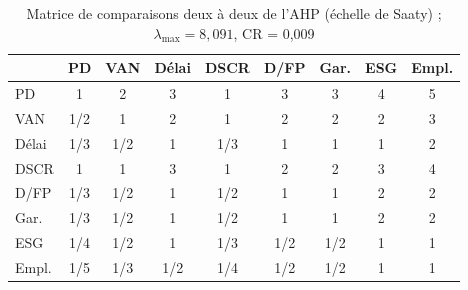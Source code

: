 \begin{table}[htbp]
\centering
\footnotesize\setlength{\tabcolsep}{4pt}
\caption{Matrice de comparaisons deux à deux de l'AHP (échelle de Saaty) ; $\lambda_{\max} = 8,091$, CR = 0,009}\label{tab:ahp}
\begin{tabular}{lcccccccc}
\toprule
 & PD & VAN & Délai & DSCR & D/FP & Gar. & ESG & Empl. \\
\midrule
PD & 1 & 2 & 3 & 1 & 3 & 3 & 4 & 5 \\
VAN & 1/2 & 1 & 2 & 1 & 2 & 2 & 2 & 3 \\
Délai & 1/3 & 1/2 & 1 & 1/3 & 1 & 1 & 1 & 2 \\
DSCR & 1 & 1 & 3 & 1 & 2 & 2 & 3 & 4 \\
D/FP & 1/3 & 1/2 & 1 & 1/2 & 1 & 1 & 2 & 2 \\
Gar. & 1/3 & 1/2 & 1 & 1/2 & 1 & 1 & 2 & 2 \\
ESG & 1/4 & 1/2 & 1 & 1/3 & 1/2 & 1/2 & 1 & 1 \\
Empl. & 1/5 & 1/3 & 1/2 & 1/4 & 1/2 & 1/2 & 1 & 1 \\
\bottomrule
\end{tabular}
\end{table}
